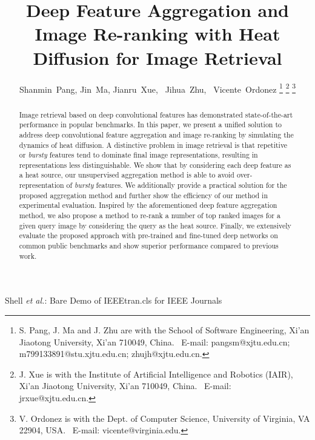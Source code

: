 \documentclass[journal]{IEEEtran}
\begin{document}
\title{Deep Feature Aggregation and Image Re-ranking with Heat Diffusion for Image Retrieval}

\author{Shanmin~Pang,
        Jin~Ma,
        Jianru~Xue,~
        Jihua~Zhu,~
        Vicente~Ordonez%
\thanks{S. Pang, J. Ma and J. Zhu are with the School of Software Engineering,
Xi'an Jiaotong University, Xi'an 710049, China.\protect
~E-mail: pangsm@xjtu.edu.cn; m799133891@stu.xjtu.edu.cn;  zhujh@xjtu.edu.cn.}%
\thanks{J. Xue is with the Institute of Artificial Intelligence and Robotics (IAIR), Xi'an Jiaotong University, Xi'an 710049, China.\protect
~E-mail: jrxue@xjtu.edu.cn.}
\thanks{V. Ordonez is with the  Dept. of Computer Science, University of Virginia, VA 22904, USA.\protect
~E-mail: vicente@virginia.edu.}}




%
{Shell \MakeLowercase{\textit{et al.}}: Bare Demo of IEEEtran.cls for IEEE Journals}











\maketitle

\begin{abstract}
Image retrieval based on deep convolutional features has demonstrated state-of-the-art performance in popular benchmarks. In this paper, we present a unified solution to address deep convolutional feature aggregation and image re-ranking by simulating the dynamics of heat diffusion.
A distinctive problem in image retrieval is that repetitive or \emph{bursty} features tend to dominate final image representations, resulting in representations less distinguishable.
We show that by considering each deep feature as a heat source, our unsupervised aggregation method is able to avoid over-representation of \emph{bursty} features. We additionally provide a practical solution for the proposed aggregation method and further show the efficiency of our method in  experimental evaluation.
Inspired by the aforementioned deep feature aggregation method, we also propose a method to re-rank a number of top ranked images for a given query image by considering the query as the heat source.
Finally, we extensively evaluate the proposed approach with  pre-trained and fine-tuned deep networks
on common public benchmarks and show superior performance compared to previous work.
\end{abstract}
\end{document}
